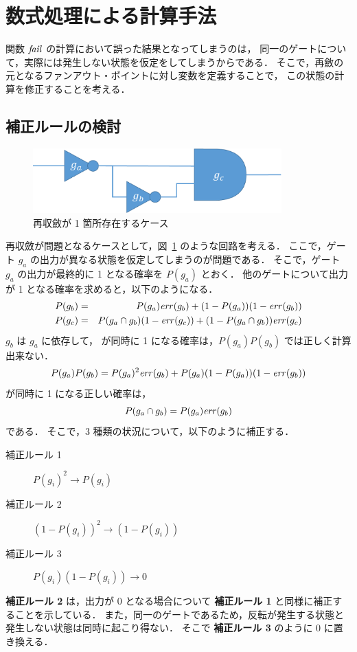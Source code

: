 \section{数式処理による計算手法}\label{sec:prop:exp}


関数 ${\it fail}$ の計算において誤った結果となってしまうのは，
同一のゲートについて，実際には発生しない状態を仮定をしてしまうからである．
そこで，再斂の元となるファンアウト・ポイントに対し変数を定義することで，
この状態の計算を修正することを考える．

\subsection{補正ルールの検討}

\begin{figure}[tbp]
  \begin{center}
    \includegraphics[height=25mm,clip]{img/min-reconv.pdf}
  \end{center}
  \caption{再収斂が 1 箇所存在するケース}
  \label{fig:min-reconv}
\end{figure}
再収斂が問題となるケースとして，図~\ref{fig:min-reconv} のような回路を考える．
ここで，ゲート $g_a$ の出力が異なる状態を仮定してしまうのが問題である．
そこで，ゲート $g_a$ の出力が最終的に 1 となる確率を $P(g_a)$ とおく．
他のゲートについて出力が 1 となる確率を求めると，以下のようになる．
\begin{eqnarray}
P(g_b) &=& P(g_a) {\it err}(g_b) + (1 - P(g_a)) (1 - {\it err}(g_b)) \nonumber \\
P(g_c) &=& P(g_a \cap g_b) (1 - {\it err}(g_c)) + (1 - P(g_a \cap g_b)) {\it err}(g_c) \nonumber
\end{eqnarray}
$g_b$ は $g_a$ に依存して，
が同時に 1 になる確率は，$P(g_a) P(g_b)$ では正しく計算出来ない．
\[ P(g_a) P(g_b) = P(g_a)^2 {\it err}(g_b) + P(g_a) (1 - P(g_a)) (1 - {\it err}(g_b)) \]
が同時に 1 になる正しい確率は，
\[ P(g_a \cap g_b) = P(g_a) {\it err}(g_b) \]
である．
そこで，3 種類の状況について，以下のように補正する．
\begin{description}
  \item[補正ルール 1] $P(g_i)^2 \rightarrow P(g_i)$
  \item[補正ルール 2] $(1 - P(g_i))^2 \rightarrow (1 - P(g_i))$
  \item[補正ルール 3] $P(g_i) (1 - P(g_i)) \rightarrow 0$
\end{description}
{\bf 補正ルール 2} は，出力が 0 となる場合について {\bf 補正ルール 1} と同様に補正することを示している．
また，同一のゲートであるため，反転が発生する状態と発生しない状態は同時に起こり得ない．
そこで {\bf 補正ルール 3} のように 0 に置き換える．

